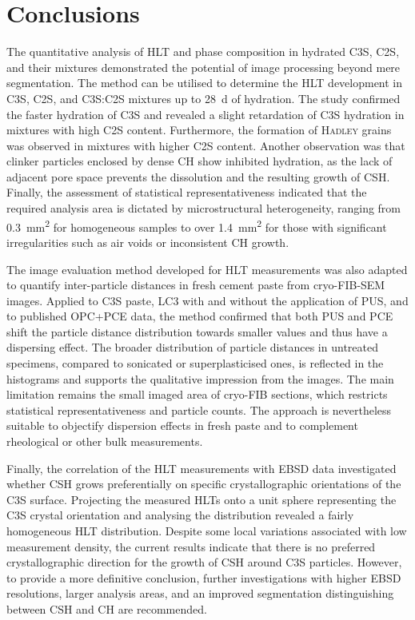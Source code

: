 \section{Conclusions}

The quantitative analysis of \ac{HLT} and phase composition in hydrated \ac{C3S}, \ac{C2S}, and their mixtures demonstrated the potential of image processing beyond mere segmentation.
The method can be utilised to determine the \ac{HLT} development in \ac{C3S}, \ac{C2S}, and \ac{C3S}:\ac{C2S} mixtures up to \qty{28}{\day} of hydration.
The study confirmed the faster hydration of \ac{C3S} and revealed a slight retardation of \ac{C3S} hydration in mixtures with high \ac{C2S} content.
Furthermore, the formation of \textsc{Hadley} grains was observed in mixtures with higher \ac{C2S} content.
Another observation was that clinker particles enclosed by dense \ac{CH} show inhibited hydration, as the lack of adjacent pore space prevents the dissolution and the resulting growth of \ac{CSH}.
Finally, the assessment of statistical representativeness indicated that the required analysis area is dictated by microstructural heterogeneity, ranging from \qty{0.3}{\milli\meter\squared} for homogeneous samples to over \qty{1.4}{\milli\meter\squared} for those with significant irregularities such as air voids or inconsistent \ac{CH} growth.

The image evaluation method developed for \ac{HLT} measurements was also adapted to quantify inter-particle distances in fresh cement paste from cryo-\ac{FIB}-\ac{SEM} images.
Applied to \ac{C3S} paste, \ac{LC3} with and without the application of \ac{PUS}, and to published \ac{OPC}+\ac{PCE} data, the method confirmed that both \ac{PUS} and \ac{PCE} shift the particle distance distribution towards smaller values and thus have a dispersing effect.
The broader distribution of particle distances in untreated specimens, compared to sonicated or superplasticised ones, is reflected in the histograms and supports the qualitative impression from the images.
The main limitation remains the small imaged area of cryo-\ac{FIB} sections, which restricts statistical representativeness and particle counts. 
The approach is nevertheless suitable to objectify dispersion effects in fresh paste and to complement rheological or other bulk measurements.

Finally, the correlation of the \ac{HLT} measurements with \ac{EBSD} data investigated whether \ac{CSH} grows preferentially on specific crystallographic orientations of the \ac{C3S} surface.
Projecting the measured \ac{HLT}s onto a unit sphere representing the \ac{C3S} crystal orientation and analysing the distribution revealed a fairly homogeneous \ac{HLT} distribution.
Despite some local variations associated with low measurement density, the current results indicate that there is no preferred crystallographic direction for the growth of \ac{CSH} around \ac{C3S} particles.
However, to provide a more definitive conclusion, further investigations with higher \ac{EBSD} resolutions, larger analysis areas, and an improved segmentation distinguishing between \ac{CSH} and \ac{CH} are recommended.

